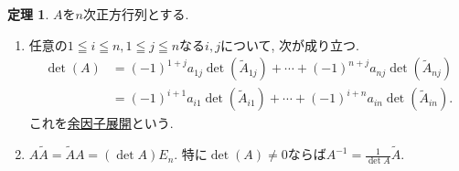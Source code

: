 \documentclass[dvipdfmx,a4paper,11pt]{article}
\theoremstyle{definition}
\newtheorem{thm}{定理}
\begin{document}
\begin{tcolorbox}[
    colback = white,
    colframe = green!35!black,
    fonttitle = \bfseries,
    breakable = true]
    \begin{thm}
 $A$を$n$次正方行列とする.
 \begin{enumerate}
\item %
任意の$1 \leqq i \leqq n, 1 \leqq j\leqq n$なる$i,j$について, 次が成り立つ.
 \begin{align*}
 \det(A) & =(-1)^{1+j}a_{1j}\det(\tilde{A}_{1j}) + \cdots +(-1)^{n+j}a_{nj}\det(\tilde{A}_{nj}) 
 \\
 &=(-1)^{i+1}a_{i1}\det(\tilde{A}_{i1}) + \cdots +(-1)^{i+n}a_{in}\det(\tilde{A}_{in}).
  \end{align*}
  これを\underline{余因子展開}という.
 \item $A\tilde{A} = \tilde{A}A =(\det A)E_n$. 特に$\det(A)\neq0$ならば$A^{-1} = \frac{1}{\det A} \tilde{A}$.
 \end{enumerate}
     \end{thm}
 \end{tcolorbox}
\end{document}
